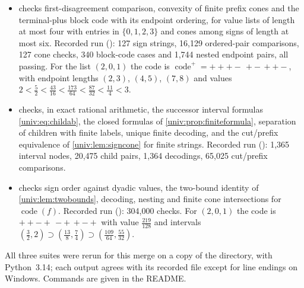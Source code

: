 \documentclass[11pt,letterpaper]{article}
\numberwithin{equation}{section}
\theoremstyle{definition}
\theoremstyle{remark}
\newcommand{\code}{\operatorname{code}}
\newcommand{\codeplus}{\operatorname{code}^{+}}
\begin{document}
\begin{itemize}
\item {} checks
first-disagreement comparison, convexity of finite prefix cones and the
terminal-plus block code with its endpoint ordering, for value lists of length
at most four with entries in $\{0,1,2,3\}$ and cones among signs of length at
most six. Recorded run
(): 127 sign strings, 16{,}129
ordered-pair comparisons, 127 cone checks, 340 block-code cases and 1{,}744
nested endpoint pairs, all passing. For the list $(2,0,1)$ the code is
$\codeplus=+{+}{+}{-}\,{+}{-}\,{+}{+}{-}$, with endpoint lengths $(2,3)$, $(4,5)$,
$(7,8)$ and values $2<\tfrac52<\tfrac{43}{16}<\tfrac{173}{64}<\tfrac{87}{32}<\tfrac{11}4<3$.
\item {} checks, in exact
rational arithmetic, the successor interval formulas \eqref{univ:eq:childab},
the closed formulas of \cref{univ:prop:finiteformula}, separation of children
with finite labels, unique finite decoding, and the cut/prefix equivalence of
\cref{univ:lem:signcone} for finite strings. Recorded run
(): 1{,}365 interval
nodes, 20{,}475 child pairs, 1{,}364 decodings, 65{,}025 cut/prefix comparisons.
\item {} checks sign order
against dyadic values, the two-bound identity of \cref{univ:lem:twobounds},
decoding, nesting and finite cone intersections for $\code(f)$. Recorded run
(): 304{,}000 checks.
For $(2,0,1)$ the code is ${+}{+}{-}{+}\,{-}{+}\,{+}{-}{+}$ with value
$\tfrac{219}{128}$ and intervals
$(\tfrac32,2)\supset(\tfrac{13}8,\tfrac74)\supset(\tfrac{109}{64},\tfrac{55}{32})$.
\end{itemize}
All three suites were rerun for this merge on a copy of the directory, with
Python~3.14; each output agrees with its recorded file except for line endings
on Windows. Commands are given in the README.
\end{document}
